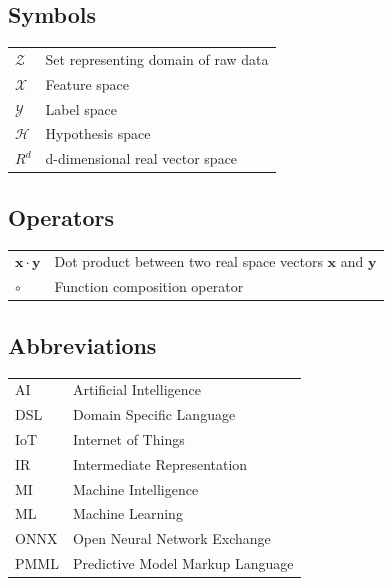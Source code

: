 \documentclass[english, 12pt, a4paper, elec, utf8, online]{aaltothesis}
\begin{document}
\newpage







\thesistableofcontents



\subsection*{Symbols}

\begin{tabular}{ll}
$\mathcal{Z}$  & Set representing domain of raw data  \\
$\mathcal{X}$  & Feature space \\
$\mathcal{Y}$  & Label space \\
$\mathcal{H}$  & Hypothesis space\\
$R^{d}$        & d-dimensional real vector space
\end{tabular}

\subsection*{Operators}

\begin{tabular}{ll}
$\mathbf{x} \cdot \mathbf{y}$              & Dot product between two real space vectors $\mathbf{x}$ and $\mathbf{y}$\\
$\circ$ & Function composition operator  
\end{tabular}

\subsection*{Abbreviations}

\begin{tabular}{ll}
AI         & Artificial Intelligence \\   
DSL        & Domain Specific Language \\
IoT        & Internet of Things \\
IR         & Intermediate Representation \\ 
MI         & Machine Intelligence \\
ML         & Machine Learning \\
ONNX       & Open Neural Network Exchange \\
PMML       & Predictive Model Markup Language\\
\end{tabular}
\end{document}
